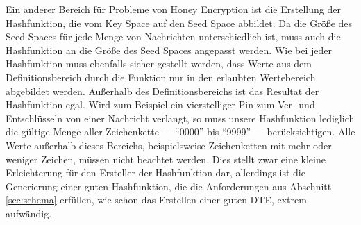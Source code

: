 \documentclass[12pt]{scrartcl}
\begin{document}
Ein anderer Bereich für Probleme von Honey Encryption ist die Erstellung der Hashfunktion, die vom Key Space auf den Seed Space abbildet. Da die Größe des Seed Spaces für jede Menge von Nachrichten unterschiedlich ist, muss auch die Hashfunktion an die Größe des Seed Spaces angepasst werden. Wie bei jeder Hashfunktion muss ebenfalls sicher gestellt werden, dass Werte aus dem Definitionsbereich durch die Funktion nur in den erlaubten Wertebereich abgebildet werden. Außerhalb des Definitionsbereichs ist das Resultat der Hashfunktion egal. Wird zum Beispiel ein vierstelliger Pin zum Ver- und Entschlüsseln von einer Nachricht verlangt, so muss unsere Hashfunktion lediglich die gültige Menge aller Zeichenkette --- ``0000'' bis ``9999'' --- berücksichtigen. Alle Werte außerhalb dieses Bereichs, beispielsweise Zeichenketten mit mehr oder weniger Zeichen, müssen nicht beachtet werden. Dies stellt zwar eine kleine Erleichterung für den Ersteller der Hashfunktion dar, allerdings ist die Generierung einer guten Hashfunktion, die die Anforderungen aus Abschnitt \ref{sec:schema} erfüllen, wie schon das Erstellen einer guten DTE, extrem aufwändig.
\end{document}
